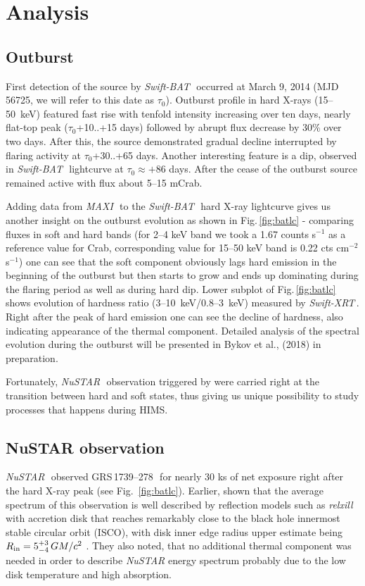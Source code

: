 \documentclass[a4paper,fleqn,usenatbib]{mnras}
\def\grs{{GRS\,1739--278\,}}
\def\swiftx{{\em Swift-XRT\,}}
\def\swiftb{{\em Swift-BAT\,}}
\def\nustar{{\em NuSTAR\,}}
\def\maxi{{\em MAXI\,}}
\begin{document}
\section{Analysis}
\subsection{Outburst}
First detection of the source by \swiftb\, \citep{krimm14_atel} occurred at March 9, 2014 (MJD 56725, we will refer to this date as $\tau_{0}$). 
Outburst profile in hard X-rays (15--50~keV) featured fast rise with tenfold intensity increasing over ten days, nearly flat-top peak ($\tau_{0}$+10..+15 days) followed by abrupt flux decrease by 30\% over two days.
After this, the source demonstrated gradual decline interrupted by flaring activity at $\tau_{0}$+30..+65 days. 
Another interesting feature is a dip, observed in \swiftb\, lightcurve at $\tau_{0} \approx +86$ days. 
After the cease of the outburst source remained active with flux about 5--15 mCrab. 

Adding data from \maxi\, to the \swiftb\, hard X-ray lightcurve gives us another insight on the outburst evolution as shown in Fig.\,\ref{fig:batlc} - comparing fluxes in soft and hard bands (for 2--4 keV band we took a 1.67 counts s$^{-1}$ as a reference value for Crab, corresponding value for 15--50 keV band is 0.22 cts cm$^{-2}$ s$^{-1}$) one can see that the soft component obviously lags hard emission in the beginning of the outburst but then starts to grow and ends up dominating during the flaring period as well as during hard dip. 
Lower subplot of Fig.\,\ref{fig:batlc} shows evolution of hardness ratio (3--10~keV/0.8--3~keV) measured by \swiftx. 
Right after the peak of hard emission one can see the decline of hardness, also indicating appearance of the thermal component.
Detailed analysis of the spectral evolution during the outburst will be presented in Bykov et al., (2018) in preparation.

Fortunately, \nustar\ observation triggered by \cite{miller15_nust} were carried right at the transition between hard and soft states, thus giving us unique possibility to study processes that happens during HIMS. 

\subsection{NuSTAR observation}
\label{sec:nust} 

\nustar\, observed \grs\ for nearly 30 ks of net exposure right after the hard X-ray peak (see Fig.~\ref{fig:batlc}). 
Earlier, \cite{miller15_nust} shown that the average spectrum of this observation is well described by reflection models such as {\it relxill} \citep{garcia14, dauser14,dauser16} with accretion disk that reaches remarkably close to the black hole innermost stable circular orbit (ISCO), with disk inner edge radius upper estimate being $R_{\rm in} = 5^{+3}_{-4}\, G M/c^{2}$ \citep{miller15_nust}. 
They also noted, that no additional thermal component was needed in order to describe {\it NuSTAR} energy spectrum probably due to the low disk temperature and high absorption.
\end{document}
